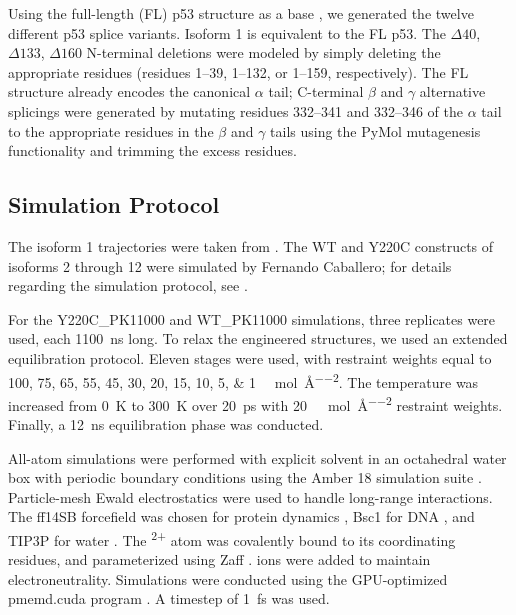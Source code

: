 Using the full-length (FL) p53 structure as a base \parencite{stetsonRestorationY220CP532025}, we generated the twelve different p53 splice variants. Isoform 1 is equivalent to the FL p53. The \(\Delta40\), \(\Delta133\), \(\Delta160\) N-terminal deletions were modeled by simply deleting the appropriate residues (residues \numrange{1}{39}, \numrange{1}{132}, or \numrange{1}{159}, respectively). The FL structure already encodes the canonical \(\alpha\) tail; C-terminal \(\beta\) and \(\gamma\) alternative splicings were generated by mutating residues \numrange{332}{341} and \numrange{332}{346} of the \(\alpha\) tail to the appropriate residues in the \(\beta\) and \(\gamma\) tails using the PyMol mutagenesis functionality \parencite{PyMOL} and trimming the excess residues.

\subsection{Simulation Protocol}
\label{chap:sim-protocol}

The isoform 1 trajectories were taken from \parencite{stetsonRestorationY220CP532025}. The WT and Y220C constructs of isoforms \num{2} through \num{12} were simulated by Fernando Caballero; for details regarding the simulation protocol, see \parencite{zotero-item-488}.

For the Y220C\_PK11000 and WT\_PK11000 simulations, three replicates were used, each \qty{1100}{\nano\second} long. To relax the engineered structures, we used an extended equilibration protocol. Eleven stages were used, with restraint weights equal to \numlist{100;75;65;55;45;30;20;15;10;5;1} \unit{\kilo\calorie\per\mol\per\angstrom^{2}}. The temperature was increased from \qty{0}{\kelvin} to \qty{300}{\kelvin} over \qty{20}{\pico\second} with \qty{20}{\kilo\calorie\per\mol\per\angstrom^{2}} restraint weights. Finally, a \qty{12}{\nano\second} equilibration phase was conducted.

All-atom simulations were performed with explicit solvent in an octahedral water box with periodic boundary conditions using the Amber 18 simulation suite \parencite{amber18}.  Particle-mesh Ewald electrostatics were used to handle long-range interactions. The ff14SB forcefield was chosen for protein dynamics \parencite{maierFf14SBImprovingAccuracy2015}, Bsc1 for DNA \parencite{ivaniParmbsc1RefinedForce2016}, and TIP3P for water \parencite{jorgensenComparisonSimplePotential1983}. The \textsuperscript{\num{2}+} atom was covalently bound to its coordinating residues, and parameterized using Zaff \parencite{petersStructuralSurveyZincContaining2010}.  ions were added to maintain electroneutrality. Simulations were conducted using the GPU-optimized pmemd.cuda program \parencite{salomon-ferrerRoutineMicrosecondMolecular2013}. A timestep of \qty{1}{\femto\second} was used.

